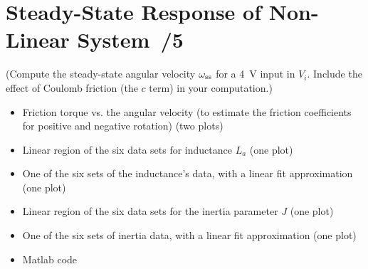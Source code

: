 \documentclass{article}
\newcommand{\score}{\hfill \underline{\hspace{0.65cm}}\,/} %
\begin{document}
\section{Steady-State Response of Non-Linear System \score 5}
(Compute the steady-state angular velocity $\omega_{\rm ss}$ for a \SI{4}{\volt} input in $V_i$. Include the effect of Coulomb friction (the $c$ term) in your computation.)
\newline \\[3mm]
\begin{itemize}
\item Friction torque vs. the angular velocity (to estimate the friction coefficients for positive and negative rotation) (two plots)
\item Linear region of the six data sets for inductance $L_a$ (one plot)
\item One of the six sets of the inductance's data, with a linear fit approximation (one plot)
\item Linear region of the six data sets for the inertia parameter $J$ (one plot)
\item One of the six sets of inertia data, with a linear fit approximation (one plot)
\item {\sc Matlab} code
\end{itemize}
\end{document}
